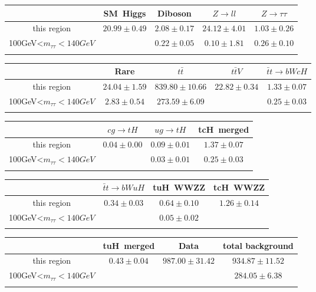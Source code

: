 \centering
\begin{tabular}{ccccc} \toprule\toprule
 & SM~Higgs & Diboson & $Z\to ll$ & $Z\to \tau\tau$\\\midrule
this region & $20.99\pm0.49$ & $2.08\pm0.17$ & $24.12\pm4.01$ & $1.03\pm0.26$\\
100GeV<$m_{\tau\tau}<140GeV$ &  & $0.22\pm0.05$ & $0.10\pm1.81$ & $0.26\pm0.10$\\
\bottomrule\bottomrule\\
\end{tabular}
\begin{tabular}{ccccc} \toprule\toprule
 & Rare & $t\bar{t}$ & $t\bar{t}V$ & $\bar{t}t\to bWcH$\\\midrule
this region & $24.04\pm1.59$ & $839.80\pm10.66$ & $22.82\pm0.34$ & $1.33\pm0.07$\\
100GeV<$m_{\tau\tau}<140GeV$ & $2.83\pm0.54$ & $273.59\pm6.09$ &  & $0.25\pm0.03$\\
\bottomrule\bottomrule\\
\end{tabular}
\begin{tabular}{cccc} \toprule\toprule
 & $cg\to tH$ & $ug\to tH$ & tcH~merged\\\midrule
this region & $0.04\pm0.00$ & $0.09\pm0.01$ & $1.37\pm0.07$\\
100GeV<$m_{\tau\tau}<140GeV$ &  & $0.03\pm0.01$ & $0.25\pm0.03$\\
\bottomrule\bottomrule\\
\end{tabular}
\begin{tabular}{cccc} \toprule\toprule
 & $\bar{t}t\to bWuH$ & tuH~WWZZ & tcH~WWZZ\\\midrule
this region & $0.34\pm0.03$ & $0.64\pm0.10$ & $1.26\pm0.14$\\
100GeV<$m_{\tau\tau}<140GeV$ &  & $0.05\pm0.02$ & \\
\bottomrule\bottomrule\\
\end{tabular}
\begin{tabular}{cccc} \toprule\toprule
 & tuH~merged & Data & total background\\\midrule
this region & $0.43\pm0.04$ & $987.00\pm31.42$ & $934.87\pm11.52$\\
100GeV<$m_{\tau\tau}<140GeV$ &  &  & $284.05\pm6.38$\\
\bottomrule\bottomrule\\
\end{tabular}

